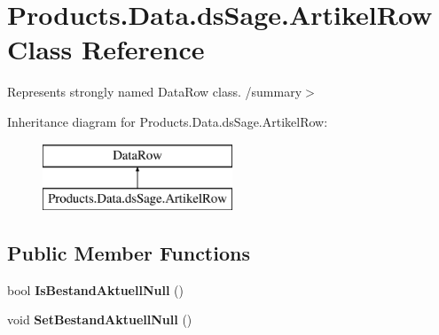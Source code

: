 \hypertarget{class_products_1_1_data_1_1ds_sage_1_1_artikel_row}{}\section{Products.\+Data.\+ds\+Sage.\+Artikel\+Row Class Reference}
\label{class_products_1_1_data_1_1ds_sage_1_1_artikel_row}


Represents strongly named Data\+Row class. /summary$>$  


Inheritance diagram for Products.\+Data.\+ds\+Sage.\+Artikel\+Row\+:\begin{figure}[H]
\begin{center}
\leavevmode
\includegraphics[height=2.000000cm]{class_products_1_1_data_1_1ds_sage_1_1_artikel_row}
\end{center}
\end{figure}
\subsection*{Public Member Functions}
\begin{DoxyCompactItemize}
\item 
bool {\bfseries Is\+Bestand\+Aktuell\+Null} ()\hypertarget{class_products_1_1_data_1_1ds_sage_1_1_artikel_row_a49ccb9a1426999789e42717d3a7bbcf5}{}\label{class_products_1_1_data_1_1ds_sage_1_1_artikel_row_a49ccb9a1426999789e42717d3a7bbcf5}

\item 
void {\bfseries Set\+Bestand\+Aktuell\+Null} ()\hypertarget{class_products_1_1_data_1_1ds_sage_1_1_artikel_row_a720250ca4c3889f461db6d854a99db69}{}\label{class_products_1_1_data_1_1ds_sage_1_1_artikel_row_a720250ca4c3889f461db6d854a99db69}

\end{DoxyCompactItemize}
